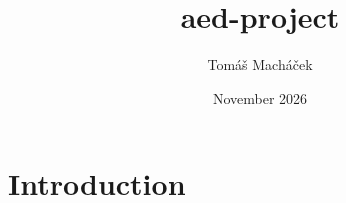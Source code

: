 \documentclass{article}
\title{aed-project}
\author{Tomáš Macháček}
\date{November 2026}
\begin{document}
\maketitle

\section{Introduction}
\end{document}
